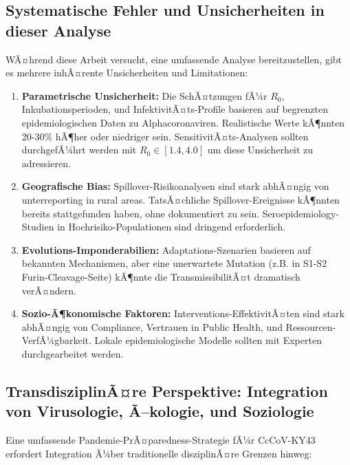﻿\documentclass[11pt,a4paper]{article}
\theoremstyle{definition}
\begin{document}
\subsection{Systematische Fehler und Unsicherheiten in dieser Analyse}

WÃ¤hrend diese Arbeit versucht, eine umfassende Analyse bereitzustellen, gibt es mehrere inhÃ¤rente Unsicherheiten und Limitationen:

\begin{enumerate}
\item \textbf{Parametrische Unsicherheit:} Die SchÃ¤tzungen fÃ¼r $R_0$, Inkubationsperioden, und Infektivi\-tÃ¤ts-Profile basieren auf begrenzten epidemiologischen Daten zu Alphacoronaviren. Realistische Werte kÃ¶nnten 20-30\% hÃ¶her oder niedriger sein. SensitivitÃ¤ts-Analysen sollten durchgefÃ¼hrt werden mit $R_0 \in [1.4, 4.0]$ um diese Unsicherheit zu adressieren.

\item \textbf{Geografische Bias:} Spillover-Risikoanalysen sind stark abhÃ¤ngig von unterreporting in rural areas. TatsÃ¤chliche Spillover-Ereignisse kÃ¶nnten bereits stattgefunden haben, ohne dokumentiert zu sein. Seroepidemiology-Studien in Hochrisiko-Populationen sind dringend erforderlich.

\item \textbf{Evolutions-Imponderabilien:} Adaptations-Szenarien basieren auf bekannten Mechanismen, aber eine unerwartete Mutation (z.B. in S1-S2 Furin-Cleavage-Seite) kÃ¶nnte die TransmissibilitÃ¤t dramatisch verÃ¤ndern.

\item \textbf{Sozio-Ã¶konomische Faktoren:} Interventions-EffektivitÃ¤ten sind stark abhÃ¤ngig von Compliance, Vertrauen in Public Health, und Ressourcen-VerfÃ¼gbarkeit. Lokale epidemiologische Modelle sollten mit Experten durchgearbeitet werden.
\end{enumerate}

\subsection{TransdisziplinÃ¤re Perspektive: Integration von Virusologie, Ã–kologie, und Soziologie}

Eine umfassende Pandemie-PrÃ¤paredness-Strategie fÃ¼r CcCoV-KY43 erfordert Integration Ã¼ber traditionelle disziplinÃ¤re Grenzen hinweg:
\end{document}
